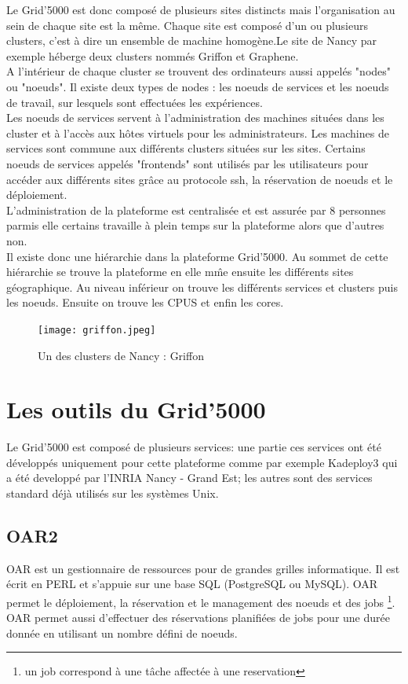 \documentclass [10pt,a4paper]{report}
\begin{document}
Le Grid'5000 est donc composé de plusieurs sites distincts mais l'organisation au sein de chaque site est la même. Chaque site est composé d'un ou plusieurs clusters, c'est à dire un ensemble de machine homogène.Le site de Nancy par exemple héberge deux clusters nommés Griffon et Graphene. \\
A l'intérieur de chaque cluster se trouvent des ordinateurs aussi appelés "nodes" ou "noeuds". Il existe deux types de nodes : les noeuds de services et les noeuds de travail, sur lesquels sont effectuées les expériences.\\
 Les noeuds de services servent à l'administration des machines situées dans les cluster et à l'accès aux hôtes virtuels pour les administrateurs. Les machines de services sont commune aux différents clusters situées sur les sites. Certains noeuds de services appelés "frontends" sont utilisés par les utilisateurs pour accéder aux différents sites grâce au protocole ssh, la réservation de noeuds et le déploiement. \\
L'administration de la plateforme est centralisée et est assurée par 8 personnes parmis elle certains travaille à plein temps sur la plateforme alors que d'autres non.\\
Il existe donc une hiérarchie dans la plateforme Grid'5000. Au sommet de cette hiérarchie se trouve la plateforme en elle m\^me ensuite les différents sites géographique. Au niveau inférieur on trouve les différents services et clusters puis les noeuds.  Ensuite on trouve les CPUS et enfin les cores.
\begin{figure}[!h]
		\centering
   		\texttt{[image: griffon.jpeg]}
   		\caption{Un des clusters de Nancy : Griffon}
    	\label{fig:griffon}
	\end{figure}
	
	\section{Les outils du Grid'5000}
		Le Grid'5000 est composé de plusieurs services: une partie ces services ont été développés uniquement pour cette plateforme comme par exemple Kadeploy3 qui a été developpé par l'INRIA Nancy - Grand Est; les autres sont des services standard déjà utilisés sur les systèmes Unix.  
		\subsection{OAR2}			
			OAR est un gestionnaire de ressources pour de grandes grilles informatique. Il est écrit en PERL et s'appuie sur une base SQL (PostgreSQL ou MySQL). OAR permet le déploiement, la réservation  et le management des noeuds et des jobs \footnote{un job correspond à une t\^ache affectée à une reservation}. OAR permet aussi d'effectuer des réservations planifiées de jobs pour une durée donnée en utilisant un nombre défini de noeuds. \\
			
\end{document}
